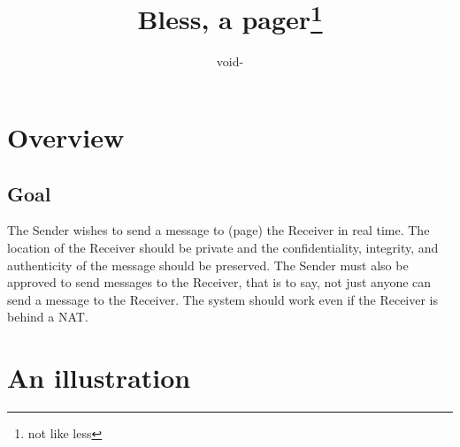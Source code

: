 \documentclass[11pt]{article}
\title{Bless, a pager\footnote{not like less}}
\author{void-}
\begin{document}
\maketitle
\section*{Overview}
\subsection*{Goal}
The Sender wishes to send a message to (page) the Receiver in real time. The
location of the Receiver should be private and the confidentiality, integrity,
and authenticity of the message should be preserved. The Sender must also be
approved to send messages to the Receiver, that is to say, not just anyone can
send a message to the Receiver. The system should work even if the Receiver is
behind a NAT.

\section*{An illustration}

\pagebreak
\end{document}
